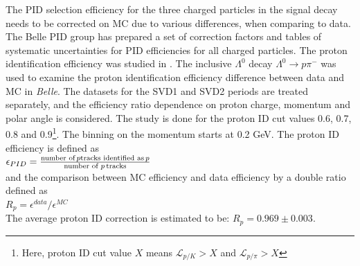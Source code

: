  The PID selection efficiency for the three charged particles in the signal decay needs
 to be corrected on MC due to various differences, when comparing to data. The
 Belle PID group has prepared a set of correction factors and tables of systematic
 uncertainties for PID efficiencies for all charged particles.
 The proton identification efficiency was studied in \cite{PIDeff}.
 The inclusive $\Lambda^0$ decay $\Lambda^0 \rightarrow p \pi^-$   was used to examine the proton identification efficiency difference between data 
 and MC in \textit{Belle}. The datasets for the SVD1 and SVD2 periods are treated separately, and the efficiency ratio dependence on proton charge, 
 momentum and polar angle is considered. The study is done for the proton ID cut values 0.6, 0.7, 0.8 and 0.9\footnote{Here, proton ID cut value $X$ means $  \mathcal{L}_{p/K} > X$ and $  \mathcal{L}_{p/\pi} > X$}. 
 The binning on the momentum starts at 0.2 GeV. 
 The proton ID efficiency is defined as\\
 \vspace{0.2cm}
 \newline
 \hspace{3 cm}    $\epsilon_{PID} = \frac{\text{number of}\hspace{0.05 cm}p \text{tracks identified as} \hspace{0.05 cm} p}{\text{number of }p \hspace{0.05 cm} \text{tracks} }$\\
 
 \vspace{0.2cm}
  and the comparison between MC efficiency and data efficiency by a double ratio defined as \\
 
 \vspace{0.2cm} \hspace{1 cm}  $ R_p = \epsilon^{data}/\epsilon^{MC}$ \\
 
 \vspace{0.5cm}
 \noindent The average proton ID correction is estimated to be: \hspace{0.5 cm} $R_p = 0.969 \pm 0.003$.
 
